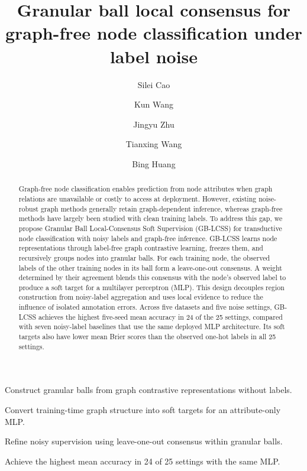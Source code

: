 \documentclass[a4paper,fleqn]{cas-sc}
\theoremstyle{definition}
\theoremstyle{plain}
\begin{document}
\let\WriteBookmarks\relax
\def\floatpagepagefraction{1}
\def\textpagefraction{.001}
\title[mode = title]{Granular ball local consensus for graph-free node classification under label noise}
\author[1]{Silei Cao}
\author[1]{Kun Wang}
\author[2]{Jingyu Zhu}
\author[3]{Tianxing Wang}
\author[1]{Bing Huang}
\cormark[1]
\begin{abstract}
Graph-free node classification enables prediction from node attributes when graph relations are unavailable or costly to access at deployment. However, existing noise-robust graph methods generally retain graph-dependent inference, whereas graph-free methods have largely been studied with clean training labels. To address this gap, we propose Granular Ball Local-Consensus Soft Supervision (GB-LCSS) for transductive node classification with noisy labels and graph-free inference. GB-LCSS learns node representations through label-free graph contrastive learning, freezes them, and recursively groups nodes into granular balls. For each training node, the observed labels of the other training nodes in its ball form a leave-one-out consensus. A weight determined by their agreement blends this consensus with the node's observed label to produce a soft target for a multilayer perceptron (MLP). This design decouples region construction from noisy-label aggregation and uses local evidence to reduce the influence of isolated annotation errors. Across five datasets and five noise settings, GB-LCSS achieves the highest five-seed mean accuracy in 24 of the 25 settings, compared with seven noisy-label baselines that use the same deployed MLP architecture. Its soft targets also have lower mean Brier scores than the observed one-hot labels in all 25 settings.
\end{abstract}

\begin{highlights}
\item Construct granular balls from graph contrastive representations without labels.
\item Convert training-time graph structure into soft targets for an attribute-only MLP.
\item Refine noisy supervision using leave-one-out consensus within granular balls.
\item Achieve the highest mean accuracy in 24 of 25 settings with the same MLP.
\end{highlights}
\end{document}
